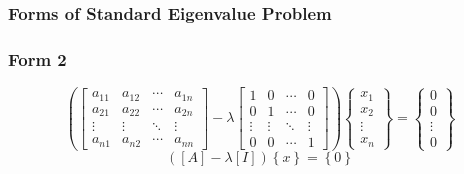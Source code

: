\documentclass[fleqn]{ltx-talk} %
\newcommand{\sectionIIsubsectionItitle}{Forms of Standard Eigenvalue Problem}
\begin{document}
			\begin{frame}
				\frametitle{\sectionIIsubsectionItitle} \small
				\bigskip

 \frametitle{Form 2}
  \begin{displaymath}
    \left( \left[ \begin{array}{cccc}
          a_{11} & a_{12} & \cdots & a_{1n} \\
          a_{21} & a_{22} & \cdots & a_{2n} \\
          \vdots & \vdots & \ddots & \vdots \\
          a_{n1} & a_{n2} & \cdots & a_{nn}
        \end{array} \right] -
      \lambda \left[ \begin{array}{cccc}
          1 & 0 & \cdots & 0 \\
          0 & 1 & \cdots & 0 \\
          \vdots & \vdots & \ddots & \vdots \\
          0 & 0 & \cdots & 1
        \end{array} \right] \right)
    \left\{ \begin{array}{c}
        x_1 \\
        x_2 \\
        \vdots \\
        x_n
      \end{array} \right\} =
    \left\{ \begin{array}{c}
        0 \\
        0 \\
        \vdots \\
        0
      \end{array} \right\}
  \end{displaymath}
  \begin{displaymath}
    \left( \left[A\right] - \lambda \left[ I \right] \right) \left\{ x \right\} = \left\{ 0 \right\}
  \end{displaymath}

				
				\btVFill
			\end{frame}
\end{document}
